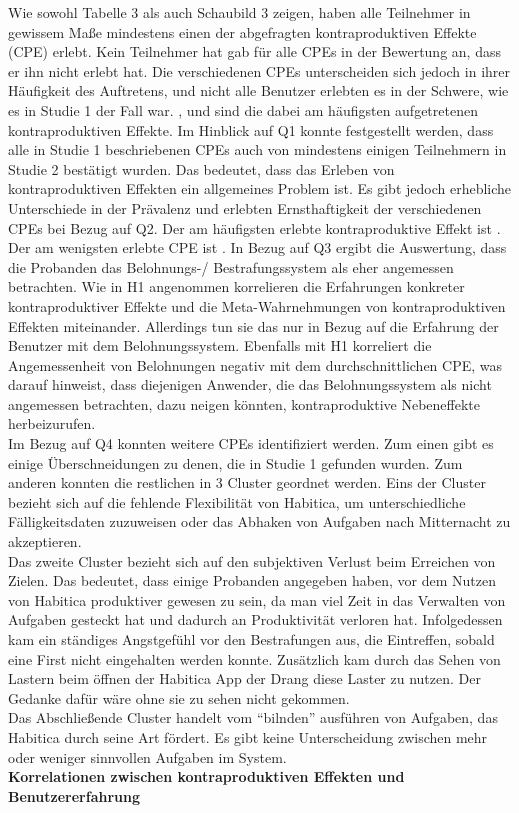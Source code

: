 \documentclass[sigconf, nonacm]{acmart}
\begin{document}
Wie sowohl Tabelle 3 als auch Schaubild 3 zeigen, haben alle Teilnehmer in gewissem Maße mindestens einen der abgefragten kontraproduktiven Effekte (CPE) erlebt. Kein Teilnehmer hat gab für alle CPEs in der Bewertung an, dass er ihn nicht erlebt hat. Die verschiedenen CPEs unterscheiden sich jedoch in ihrer Häufigkeit des Auftretens, und nicht alle Benutzer erlebten es in der Schwere, wie es in Studie 1 der Fall war. ,  und  sind die dabei am häufigsten aufgetretenen kontraproduktiven Effekte. 
Im Hinblick auf Q1 konnte festgestellt werden, dass alle in Studie 1 beschriebenen CPEs auch von mindestens einigen Teilnehmern in Studie 2 bestätigt wurden. Das bedeutet, dass das Erleben von kontraproduktiven Effekten ein allgemeines Problem ist. Es gibt jedoch erhebliche Unterschiede in der Prävalenz und erlebten Ernsthaftigkeit der verschiedenen CPEs bei Bezug auf Q2. Der am häufigsten erlebte kontraproduktive Effekt ist . Der am wenigsten erlebte CPE ist . In Bezug auf Q3 ergibt die Auswertung, dass die Probanden das Belohnungs-/ Bestrafungssystem als eher angemessen betrachten. 
Wie in H1 angenommen korrelieren die Erfahrungen konkreter kontraproduktiver Effekte und die Meta-Wahrnehmungen von kontraproduktiven Effekten miteinander. Allerdings tun sie das nur in Bezug auf die Erfahrung der Benutzer mit dem Belohnungssystem. Ebenfalls mit H1 korreliert die Angemessenheit von Belohnungen negativ mit dem durchschnittlichen CPE, was darauf hinweist, dass diejenigen Anwender, die das Belohnungssystem als nicht angemessen betrachten, dazu neigen könnten, kontraproduktive Nebeneffekte herbeizurufen. 
\\
Im Bezug auf Q4 konnten weitere CPEs identifiziert werden. Zum einen gibt es einige Überschneidungen zu denen, die in Studie 1 gefunden wurden. Zum anderen konnten die restlichen in 3 Cluster geordnet werden. 
Eins der Cluster bezieht sich auf die fehlende Flexibilität von Habitica, um unterschiedliche Fälligkeitsdaten zuzuweisen oder das Abhaken von Aufgaben nach Mitternacht zu akzeptieren. 
\\
Das zweite Cluster bezieht sich auf den subjektiven Verlust beim Erreichen von Zielen. Das bedeutet, dass einige Probanden angegeben haben, vor dem Nutzen von Habitica produktiver gewesen zu sein, da man viel Zeit in das Verwalten von Aufgaben gesteckt hat und dadurch an Produktivität verloren hat. Infolgedessen kam ein ständiges Angstgefühl vor den Bestrafungen aus, die Eintreffen, sobald eine First nicht eingehalten werden konnte. Zusätzlich kam durch das Sehen von Lastern beim öffnen der Habitica App der Drang diese Laster zu nutzen. Der Gedanke dafür wäre ohne sie zu sehen nicht gekommen.
\\
Das Abschließende Cluster handelt vom \enquote{bilnden} ausführen von Aufgaben, das Habitica durch seine Art fördert. Es gibt keine Unterscheidung zwischen mehr oder weniger sinnvollen Aufgaben im System. 
\\
\textbf{Korrelationen zwischen kontraproduktiven Effekten und Benutzererfahrung}
\end{document}
